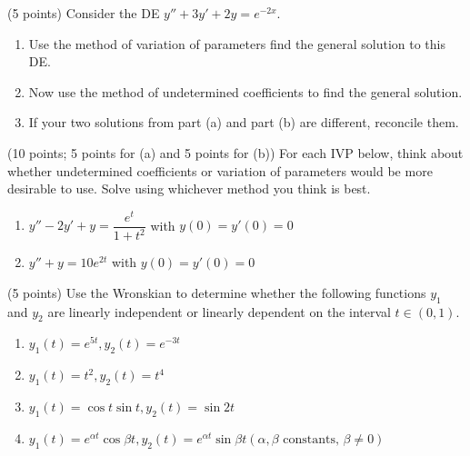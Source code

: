 \newpage


\begin{problem}[3]
(5 points) Consider the DE $y'' + 3y' + 2y = e^{-2x}$.

\begin{enumerate}
\item Use the method of variation of parameters find the general solution to this DE. 
\item Now use the method of undetermined coefficients to find the general solution.
\item If your two solutions from part (a) and part (b) are different, reconcile them.
\end{enumerate}
\end{problem}

\newpage


\begin{problem}[4]
(10 points; 5 points for (a) and 5 points for (b)) For each IVP below, think about whether undetermined coefficients or variation of parameters would be more desirable to use. Solve using whichever method you think is best.

\begin{enumerate}
\item $y''-2y'+y=\dfrac {e^t}{1+t^2}$ with $y(0)=y'(0)=0$
\item $y''+y=10e^{2t}$ with $y(0)=y'(0)=0$
\end{enumerate}
\end{problem}

\newpage


\begin{problem}[5]
(5 points) Use the Wronskian to determine whether the following functions $y_1$ and $y_2$ are
linearly independent or linearly dependent on the interval $t \in (0, 1)$.

\begin{enumerate}
\item $y_1(t) = e^{5t}, y_2(t) = e^{-3t} $
\item $y_1(t) = t^2, y_2(t) = t^4$
\item $y_1(t) = \cos t \sin t, y_2(t) = \sin 2t$
\item $y_1(t) = e^{\alpha t} \cos \beta t, y_2(t) = e^{\alpha t} \sin \beta t (\alpha, \beta \text{ constants, } \beta \neq 0)$
\end{enumerate}
\end{problem}


